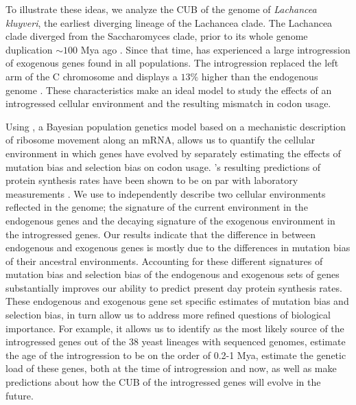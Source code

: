 To illustrate these ideas, we analyze the CUB of the genome of \emph{Lachancea kluyveri}, the earliest diverging lineage of the Lachancea clade.
The Lachancea clade diverged from the Saccharomyces clade, prior to its whole genome duplication $\sim 100$ Mya ago \citep{MHM2015,Beimforde2014}.
Since that time, \kluyveri has experienced a large introgression of exogenous genes found in all populations\citep{friedrich2015}.
The introgression replaced the left arm of the C chromosome and displays a $13 \%$ higher \GC than the endogenous \kluyveri genome \citep{payen2009, friedrich2015}.
These characteristics make \kluyveri an ideal model to study the effects of an introgressed cellular environment and the resulting mismatch in codon usage.

Using \ROC, a Bayesian population genetics model based on a mechanistic description of ribosome movement along an mRNA, allows us to quantify the cellular environment in which genes have evolved by separately estimating the effects of mutation bias and selection bias on codon usage.
\ROC's resulting predictions of protein synthesis rates have been shown to be on par with laboratory measurements \citep{ShahAndGilchrist2011, gilchrist2015}.
We use \ROC to independently describe two cellular environments reflected in the \kluyveri genome; the signature of the current environment in the endogenous genes and the decaying signature of the exogenous environment in the introgressed genes.
Our results indicate that the difference in \GC between endogenous and exogenous genes is mostly due to the differences in mutation bias of their ancestral environments.
Accounting for these different signatures of mutation bias and selection bias of the endogenous and exogenous sets of genes substantially improves our ability to predict present day protein synthesis rates.
These endogenous and exogenous gene set specific estimates of mutation bias and selection bias, in turn allow us to address more refined questions of biological importance.
For example, it allows us to identify \gossypii as the most likely source of the introgressed genes out of the 38 yeast lineages with sequenced genomes, estimate the age of the introgression to be on the order of 0.2-1 Mya, estimate the genetic load of these genes, both at the time of introgression and now, as well as make predictions about how the CUB of the introgressed genes will evolve in the future.

